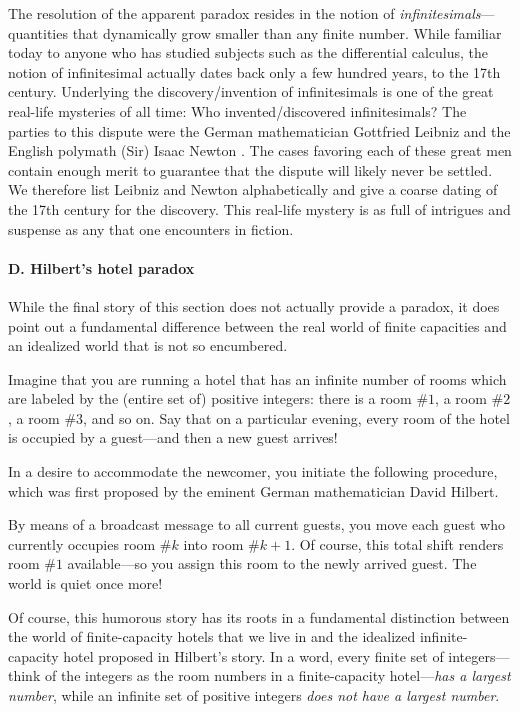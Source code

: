 The resolution of the apparent paradox resides in the notion of
 {\em infinitesimals}---quantities that
dynamically grow smaller than any finite number.  While familiar today
to anyone who has studied subjects such as the differential calculus,
the notion of infinitesimal actually dates back only a few hundred
years, to the 17th century.  Underlying the discovery/invention of
infinitesimals is one of the great real-life mysteries of all time:
Who invented/discovered infinitesimals? The parties to this dispute
were the German mathematician Gottfried Leibniz \cite{Leibniz}
 and the English polymath
(Sir) Isaac Newton \cite{Newton}.   The cases
favoring each of these great men contain enough merit to guarantee
that the dispute will likely never be settled.  We therefore list
Leibniz and Newton alphabetically and give a coarse dating of the 17th
century for the discovery.  This real-life mystery is as full of
intrigues and suspense as any that one encounters in fiction.


\paragraph{D. Hilbert's hotel paradox}

While the final story of this section does not actually provide a
paradox, it does point out a fundamental difference between the real
world of finite capacities and an idealized world that is not so
encumbered.

Imagine that you are running a hotel that has an infinite number of
rooms which are labeled by the (entire set of) positive integers:
there is a room \#$1$, a room \#$2$, a room \#$3$, and so on.  Say
that on a particular evening, every room of the hotel is occupied by a
guest---and then a new guest arrives!

In a desire to accommodate the newcomer, you initiate the following
procedure, which was first proposed by the eminent German
mathematician David Hilbert. 

By means of a broadcast message to all current guests, you move each
guest who currently occupies room \#$k$ into room \#$k+1$.  Of course,
this total shift renders room \#$1$ available---so you assign this
room to the newly arrived guest.  The world is quiet once more!

Of course, this humorous story has its roots in a fundamental
distinction between the world of finite-capacity hotels that we live
in and the idealized infinite-capacity hotel proposed in Hilbert's
story.  In a word, every finite set of integers---think of the
integers as the room numbers in a finite-capacity hotel---{\em has a
largest number}, while an infinite set of positive integers {\em
does not have a largest number}.
\medskip
  
